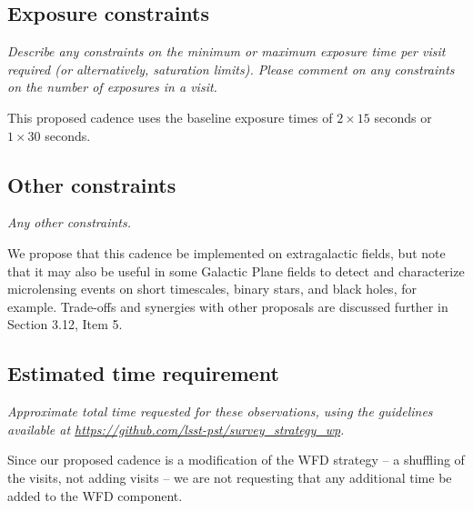 \documentclass[12pt, letterpaper]{article}
\begin{document}
\subsection{Exposure constraints}
\begin{footnotesize}
{\it Describe any constraints on the minimum or maximum exposure time per visit required (or alternatively, saturation limits). Please comment on any constraints on the number of exposures in a visit.}
\end{footnotesize}

This proposed cadence uses the baseline exposure times of $2\times15$ seconds or $1\times30$ seconds.

\subsection{Other constraints}
\begin{footnotesize}
{\it Any other constraints.}
\end{footnotesize}

We propose that this cadence be implemented on extragalactic fields, but note that it may also be useful in some Galactic Plane fields to detect and characterize microlensing events on short timescales, binary stars, and black holes, for example. Trade-offs and synergies with other proposals are discussed further in Section 3.12, Item 5.


\subsection{Estimated time requirement}
\begin{footnotesize}
{\it Approximate total time requested for these observations, using the guidelines available at \url{https://github.com/lsst-pst/survey_strategy_wp}.}
\end{footnotesize}

Since our proposed cadence is a modification of the WFD strategy -- a shuffling of the visits, not adding visits -- we are not requesting that any additional time be added to the WFD component.

\vspace{.3in}
\end{document}

